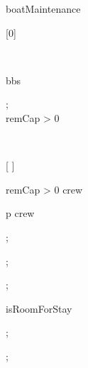 \begin{op}[e]{boatMaintenance}%
\signature{() \Oto ()}
\parms{}
\begin{blockstmt}
\begin{dclstmt}
[{0}]
\end{dclstmt}
\begin{letstmt}
\end{letstmt} \\
\begin{blockstmt}
\begin{setfor}{b}{bs}
\end{setfor} ; \\
\If remCap > 0
\Then \\
\begin{blockstmt}
\begin{letstmt}
\end{letstmt} \\
\begin{blockstmt}
\begin{dclstmt}
[{ \Dunion {}}]
\end{dclstmt}
\begin{while}{remCap > 0 \And crew \Neq \set{}}
\begin{blockstmt}
\Letbe* p \In crew \Lin \\
\begin{blockstmt}
 ; \\
\end{blockstmt} ; \\
\end{blockstmt}
\end{while}
\end{blockstmt}
\end{blockstmt}
\Fi
\end{blockstmt}
\end{blockstmt};
\end{op}
\begin{op}[e]{isRoomForStay}%
\signature{() \Oto \Bool }
\parms{}
\begin{blockstmt}
 ; \\
\end{blockstmt};
\end{op}
